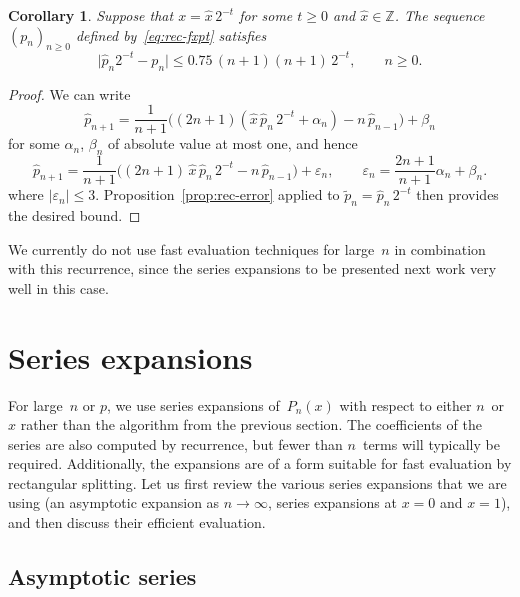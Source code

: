 \documentclass[11pt,a4paper]{article}
\newtheorem{corollary}[theorem]{Corollary}
\newcommand{\abs}[1]{\mathopen| #1 \mathclose|}
\begin{document}
\begin{corollary}
Suppose that $x = \hat x \, 2^{-t}$ for some $t \geq 0$ and
$\hat x \in \mathbb Z$.
The sequence $(p_n)_{n \geq 0}$ defined by \eqref{eq:rec-fxpt}
satisfies
\[
  \abs{ \hat p_n 2^{-t} - p_n }
  \leq 0.75 \, (n+1) (n+1) \, 2^{-t},
  \qquad
  n \geq 0.
\]
\end{corollary}

\begin{proof}
We can write
\[
  \hat{p}_{n + 1} = \frac{1}{n + 1}  \bigl((2 n + 1)  (\hat{x} \,
        \hat{p}_n \, 2^{- t} + \alpha_n) - n \, \hat{p}_{n - 1}\bigr)
        + \beta_n
\]
for some $\alpha_n$, $\beta_n$ of absolute value at most one, and
hence
\[
  \hat{p}_{n + 1} = \frac{1}{n + 1}  \bigl((2 n + 1) \, \hat{x} \,
  \hat{p}_n \, 2^{- t} - n \, \hat{p}_{n - 1}\bigr) + \varepsilon_n,
  \qquad
  \varepsilon_n = \frac{2 n + 1}{n + 1} \alpha_n + \beta_n.
\]
where $\abs{\varepsilon_n} \leq 3$.
Proposition \ref{prop:rec-error} applied to
$\tilde p_n = \hat p_n \, 2^{-t}$
then provides the desired bound.
\end{proof}

We currently do not use fast evaluation techniques for large~$n$ in
combination with this recurrence, since the series expansions to be
presented next work very well in this case.

\section{Series expansions}

\label{sec:series}

For large $n$ or $p$, we use series expansions of $P_n(x)$ with
respect to either $n$ or $x$ rather than the algorithm from the
previous section.
The coefficients of the series are also computed by recurrence,
but fewer than $n$ terms will typically be required.
Additionally, the expansions are of a form suitable for fast
evaluation by rectangular splitting.
Let us first review the various series expansions that we are using
(an asymptotic expansion as $n \to \infty$, series expansions at $x=0$
and $x=1$), and then discuss their efficient evaluation.

\subsection{Asymptotic series}
\end{document}

